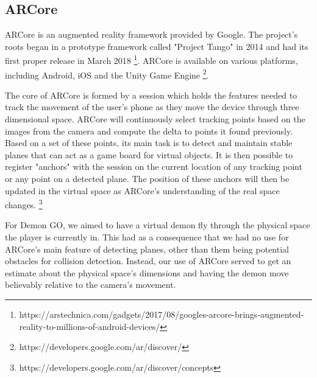 \subsection{ARCore}

ARCore is an augmented reality framework provided by Google. The project's roots began in a prototype framework called "Project Tango" in 2014 and had its first proper release in March 2018 \footnote{https://arstechnica.com/gadgets/2017/08/googles-arcore-brings-augmented-reality-to-millions-of-android-devices/}. ARCore is available on various platforms, including Android, iOS and the Unity Game Engine \footnote{https://developers.google.com/ar/discover/}.

The core of ARCore is formed by a session which holds the features needed to track the movement of the user's phone as they move the device through three dimensional space. ARCore will continuously select tracking points based on the images from  the camera and compute the delta to points it found previously. Based on a set of these points, its main task is to detect and maintain stable planes that can act as a game board for virtual objects. It is then possible to register "anchors" with the session on the current location of any tracking point or any point on a detected plane. The position of these anchors will then be updated in the virtual space as ARCore's understanding of the real space changes. \footnote{https://developers.google.com/ar/discover/concepts}

For Demon GO, we aimed to have a virtual demon fly through the physical space the player is currently in. This had as a consequence that we had no use for ARCore's main feature of detecting planes, other than them being potential obstacles for collision detection. Instead, our use of ARCore served to get an estimate about the physical space's dimensions and having the demon move believably relative to the camera's movement.

